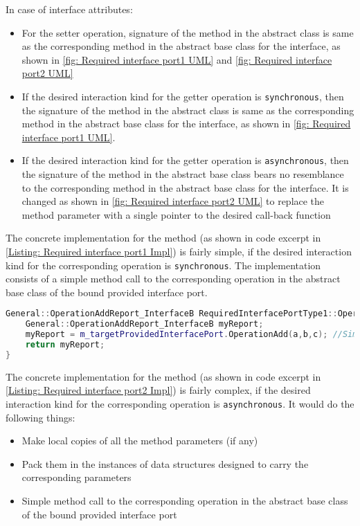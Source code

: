 In case of interface attributes:
\begin{itemize}
\item For the setter operation, signature of the method in the abstract class is same as the corresponding method in the abstract base class for the interface, as shown in \cref{fig: Required interface port1 UML} and \cref{fig: Required interface port2 UML}
\item If the desired interaction kind for the getter operation is \texttt{synchronous}, then the signature of the method in the abstract class is same as the corresponding method in the abstract base class for the interface, as shown in \cref{fig: Required interface port1 UML}. 
\item If the desired interaction kind for the getter operation is \texttt{asynchronous}, then the signature of the method in the abstract base class bears no resemblance to the corresponding method in the abstract base class for the interface. It is changed as shown in \cref{fig: Required interface port2 UML} to replace the method parameter with a single pointer to the desired call-back function  
\end{itemize} 

The concrete implementation for the method (as shown in code excerpt in \cref{Listing: Required interface port1 Impl}) is fairly simple, if the desired interaction kind for the corresponding operation is \texttt{synchronous}. The implementation consists of a simple method call to the corresponding operation in the abstract base class of the bound provided interface port.

\begin{Listing}
\begin{lstlisting}[language=C++]
General::OperationAddReport_InterfaceB RequiredInterfacePortType1::OperationAdd (const IntegerType& a,const IntegerType& b,IntegerType& c) {
	General::OperationAddReport_InterfaceB myReport;
	myReport = m_targetProvidedInterfacePort.OperationAdd(a,b,c); //Simple method call
	return myReport;
}
\end{lstlisting}
\caption{Code excerpt from the generated code for requesting service \texttt{OperationAdd} in \texttt{Required\allowbreak InterfacePort\allowbreak Type1}}
\label{Listing: Required interface port1 Impl}
\end{Listing}

The concrete implementation for the method (as shown in code excerpt in \cref{Listing: Required interface port2 Impl}) is fairly complex, if the desired interaction kind for the corresponding operation is \texttt{asynchronous}. It would do the following things: 
\begin{itemize}
\item Make local copies of all the method parameters (if any)
\item Pack them in the instances of data structures designed to carry the corresponding parameters
\item Simple method call to the corresponding operation in the abstract base class of the bound provided interface port
\end{itemize}

